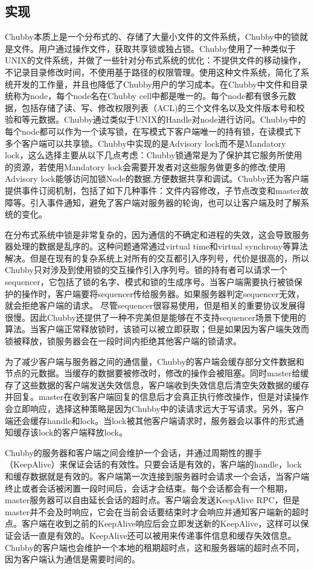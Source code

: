 \documentclass[UTF8]{article}
\begin{document}
\subsection{实现}
	Chubby本质上是一个分布式的、存储了大量小文件的文件系统，Chubby中的锁就是文件。用户通过操作文件，获取共享锁或独占锁。Chubby使用了一种类似于UNIX的文件系统，并做了一些针对分布式系统的优化：不提供文件的移动操作，不记录目录修改时间，不使用基于路径的权限管理。使用这种文件系统，简化了系统开发的工作量，并且也降低了Chubby用户的学习成本。在Chubby中文件和目录统称为node，每个node名在Chubby cell中都是唯一的。每个node都有很多元数据，包括存储了读、写、修改权限列表（ACL)的三个文件名以及文件版本号和校验和等元数据。Chubby通过类似于UNIX的Handle对node进行访问。Chubby中的每个node都可以作为一个读写锁，在写模式下客户端唯一的持有锁，在读模式下多个客户端可以共享锁。Chubby中实现的是Advisory lock而不是Mandatory lock，这么选择主要从以下几点考虑：Chubby锁通常是为了保护其它服务所使用的资源，若使用Mandatory lock会需要开发者对这些服务做更多的修改;使用Advisory lock能够访问加锁Node的数据,方便数据共享和调试。Chubby还为客户端提供事件订阅机制，包括了如下几种事件：文件内容修改，子节点改变和master故障等。引入事件通知，避免了客户端对服务器的轮询，也可以让客户端及时了解系统的变化。
	
	在分布式系统中锁是非常复杂的，因为通信的不确定和进程的失效，这会导致服务器处理的数据是乱序的。这种问题通常通过virtual time和virtual synchrony等算法解决。但是在现有的复杂系统上对所有的交互都引入序列号，代价是很高的，所以Chubby只对涉及到使用锁的交互操作引入序列号。锁的持有者可以请求一个sequencer，它包括了锁的名字、模式和锁的生成序号。当客户端需要执行被锁保护的操作时，客户端要将sequencer传给服务器。如果服务器判定sequencer无效，就会拒绝客户端的请求。
	尽管sequencer很容易使用，但是相关的重要协议发展得很慢。因此Chubby还提供了一种不完美但是能够在不支持sequencer场景下使用的算法。当客户端正常释放锁时，该锁可以被立即获取；但是如果因为客户端失效而锁被释放，锁服务器会在一段时间内拒绝其他客户端的锁请求。
	
	
	
	
	为了减少客户端与服务器之间的通信量，Chubby的客户端会缓存部分文件数据和节点的元数据。当缓存的数据要被修改时，修改的操作会被阻塞。同时master给缓存了这些数据的客户端发送失效信息，客户端收到失效信息后清空失效数据的缓存并回复。master在收到客户端回复的信息后才会真正执行修改操作，但是对读操作会立即响应，选择这种策略是因为Chubby中的读请求远大于写请求。另外，客户端还会缓存handle和lock。当lock被其他客户端请求时，服务器会以事件的形式通知缓存该lock的客户端释放lock。

	Chubby的服务器和客户端之间会维护一个会话，并通过周期性的握手（KeepAlive）来保证会话的有效性。只要会话是有效的，客户端的handle，lock和缓存数据就是有效的。客户端第一次连接到服务器时会请求一个会话，当客户端终止或者会话被闲置一段时间后，会话才会结束。每个会话都会有一个租期，master服务器可以自由延长会话的超时点。客户端会发送KeepAlive RPC，但是master并不会及时响应，它会在当前会话要结束时才会响应并通知客户端新的超时点。客户端在收到之前的KeepAlive响应后会立即发送新的KeepAlive，这样可以保证会话一直是有效的。KeepAlive还可以被用来传递事件信息和缓存失效信息。Chubby的客户端也会维护一个本地的租期超时点，这和服务器端的超时点不同，因为客户端认为通信是需要时间的。
\end{document}
